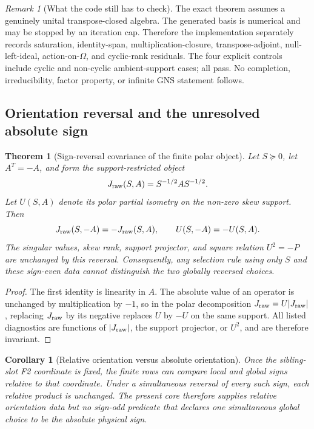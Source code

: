 \documentclass[11pt]{article}
\newtheorem{theorem}[definition]{Theorem}
\newtheorem{corollary}[definition]{Corollary}
\theoremstyle{remark}
\newtheorem{remark}[definition]{Remark}
\numberwithin{equation}{section}
\begin{document}
\begin{remark}[What the code still has to check]
The exact theorem assumes a genuinely unital transpose-closed algebra. The generated basis is numerical and may be stopped by an iteration cap. Therefore the implementation separately records saturation, identity-span, multiplication-closure, transpose-adjoint, null-left-ideal, action-on-\(\Omega\), and cyclic-rank residuals. The four explicit controls include cyclic and non-cyclic ambient-support cases; all pass. No completion, irreducibility, factor property, or infinite GNS statement follows.
\end{remark}

\subsection{Orientation reversal and the unresolved absolute sign}
\begin{theorem}[Sign-reversal covariance of the finite polar object]\label{thm:j-sign-reversal}
Let \(S\succeq0\), let \(A^T=-A\), and form the support-restricted object
\[
 J_{\rm raw}(S,A)=S^{-1/2}AS^{-1/2}.
\]
Let \(U(S,A)\) denote its polar partial isometry on the non-zero skew support. Then
\begin{equation}
 J_{\rm raw}(S,-A)=-J_{\rm raw}(S,A),
 \qquad
 U(S,-A)=-U(S,A).
 \label{eq:j-sign-reversal-covariance}
\end{equation}
The singular values, skew rank, support projector, and square relation \(U^2=-P\) are unchanged by this reversal. Consequently, any selection rule using only \(S\) and these sign-even data cannot distinguish the two globally reversed choices.
\end{theorem}

\begin{proof}
The first identity is linearity in \(A\). The absolute value of an operator is unchanged by multiplication by \(-1\), so in the polar decomposition \(J_{\rm raw}=U|J_{\rm raw}|\), replacing \(J_{\rm raw}\) by its negative replaces \(U\) by \(-U\) on the same support. All listed diagnostics are functions of \(|J_{\rm raw}|\), the support projector, or \(U^2\), and are therefore invariant.
\end{proof}

\begin{corollary}[Relative orientation versus absolute orientation]\label{cor:relative-absolute-orientation}
Once the sibling-slot F2 coordinate is fixed, the finite rows can compare local and global signs relative to that coordinate. Under a simultaneous reversal of every such sign, each relative product is unchanged. The present core therefore supplies relative orientation data but no sign-odd predicate that declares one simultaneous global choice to be the absolute physical sign.
\end{corollary}
\end{document}
